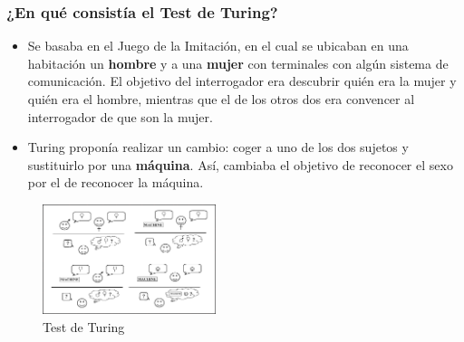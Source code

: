 \documentclass[9pt]{beamer} %
\begin{document}
	\begin{frame}
	\frametitle{¿En qué consistía el Test de Turing?}
	\begin{itemize}
	    \item Se basaba en el Juego de la Imitación, en el cual se ubicaban en una habitación un \textbf{hombre} y a una \textbf{mujer} con terminales con algún sistema de comunicación. El objetivo del interrogador era descubrir quién era la mujer y quién era el hombre, mientras que el de los otros dos era convencer al interrogador de que son la mujer.
	    \item Turing proponía realizar un cambio: coger a uno de los dos sujetos y sustituirlo por una \textbf{máquina}. Así, cambiaba el objetivo de reconocer el sexo por el de reconocer la máquina.
	\end{itemize}
	
	\begin{figure}[H]
    \centering
    \includegraphics[width=0.45\textwidth]{testdeturing.PNG}
    \caption{Test de Turing}
    \label{Test de Turing}
    \end{figure}
	\end{frame}
\end{document}
